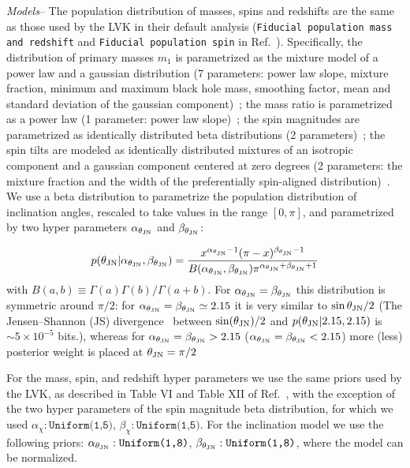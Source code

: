 \documentclass[floats,floatfix,showpacs,amssymb,prl,twocolumn,superscriptaddress,nofootinbib]{revtex4-2}
\newcommand{\beq}{\begin{equation}}
\newcommand{\eeq}{\end{equation}}
\newcommand\prlsec[1]{\vspace{2mm}\noindent \emph{#1}--}
\newcommand{\tjn}{\ensuremath{\theta_{\rm{JN}}}\xspace}
\newcommand{\atjn}{\ensuremath{\alpha_{\tjn}}\xspace}
\newcommand{\btjn}{\ensuremath{\beta_{\tjn}}\xspace}
\newcommand{\nn}{\nonumber}
\begin{document}
\prlsec{Models} The population distribution of masses, spins and redshifts are the same as those used by the LVK in their default analysis (\texttt{Fiducial population mass and redshift} and \texttt{Fiducial population spin} in Ref.~\cite{LIGOScientific:2021psn}). Specifically, the distribution of primary masses $m_1$ is parametrized as the mixture model of a power law and a gaussian distribution (7 parameters: power law slope, mixture fraction, minimum and maximum black hole mass, smoothing factor, mean and standard deviation of the gaussian component)~\cite{Talbot:2018cva}; the mass ratio is parametrized as a power law (1 parameter: power law slope)~\cite{Fishbach:2018edt}; the spin magnitudes are parametrized as identically distributed beta distributions (2 parameters)~\cite{Wysocki:2018}; the spin tilts are modeled as identically distributed mixtures of an isotropic component  and a gaussian component centered at zero degrees (2 parameters: the mixture fraction and the width of the preferentially spin-aligned distribution)~\cite{Talbot:2017yur}. 
We use a beta distribution to parametrize the population distribution of inclination angles, rescaled to take values in the range $[0,\pi]$, and parametrized by two hyper parameters \atjn and \btjn:

\beq
p(\tjn | \alpha_{\tjn}, \beta_{\tjn}) = \frac{x^{\atjn - 1} (\pi - x)^{\btjn - 1}}{B(\atjn, \btjn) \pi^{\atjn + \btjn + 1}}\nn
\eeq
with $B(a,b)\equiv \Gamma(a) \Gamma(b)/\Gamma(a+b)$. For $\atjn=\btjn$ this distribution is symmetric around $\pi/2$: for $\atjn=\btjn\simeq 2.15$ it is very similar to $\sin\tjn/2$ (The Jensen–Shannon (JS) divergence~\cite{61115, kullback1951} between $\sin(\tjn)/2$ and $p(\tjn |2.15,2.15)$ is $\sim 5\times 10^{-5}$ bits.), whereas for $\atjn=\btjn > 2.15$ ($\atjn=\btjn < 2.15$) more (less) posterior weight is placed at $\tjn=\pi/2$

For the mass, spin, and redshift hyper parameters we use the same priors used by the LVK, as described in Table VI and Table XII of Ref.~\cite{LIGOScientific:2021psn}, with the exception of the two hyper parameters of the spin magnitude beta distribution, for which we used $\alpha_{\chi}: \texttt{Uniform(1,5)}$, $\beta_{\chi}: \texttt{Uniform(1,5)}$.  For the inclination model we use the following priors: $\atjn: \texttt{Uniform(1,8)}$, $\btjn: \texttt{Uniform(1,8)}$, where the model can be normalized.
\end{document}
